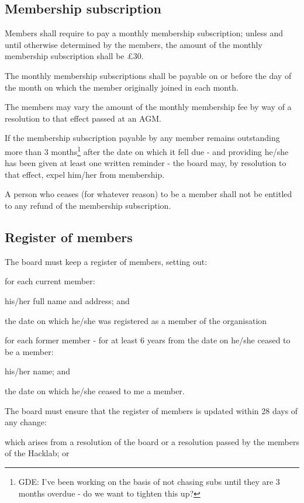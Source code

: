 \documentclass{article}
\begin{document}
\subsection{Membership subscription}

\clause Members shall require to pay a monthly membership
subscription; unless and until otherwise determined by the members,
the amount of the monthly membership subscription shall be \pounds 30.

\clause The monthly membership subscriptions shall be payable on or
before the day of the month on which the member originally joined in
each month.

\clause The members may vary the amount of the monthly membership fee
by way of a resolution to that effect passed at an AGM.

\clause If the membership subscription payable by any member remains
outstanding more than 3 months\footnote{GDE: I've been working on the
  basis of not chasing subs until they are 3 months overdue - do we
  want to tighten this up?} after the date on which it fell due - and
providing he/she has been given at least one written reminder - the
board may, by resolution to that effect, expel him/her from membership.

\clause A person who ceases (for whatever reason) to be a member shall
not be entitled to any refund of the membership subscription.

\subsection{Register of members}

\clause The board must keep a register of members, setting out:

\subclause for each current member:

\subsubclause his/her full name and address; and

\subsubclause the date on which he/she was registered as a member of
the organisation

\subclause for each former member - for at least 6 years from the date
on he/she ceased to be a member:

\subsubclause his/her name; and

\subsubclause the date on which he/she ceased to me a member.

\clause The board must ensure that the register of members is updated
within 28 days of any change:

\subclause which arises from a resolution of the board or a resolution
passed by the members of the Hacklab; or
\end{document}
